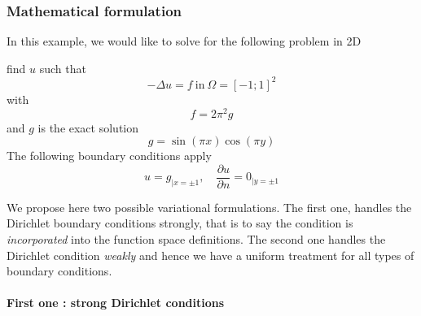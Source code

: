 \subsubsection{Mathematical formulation}
\label{sec:math-form-3}
In this example, we would like to solve for the following problem in 2D
\begin{problem}
\label{prob:1}
 find $u$ such that
\begin{equation}
  \label{eq:1}
  -\Delta u = f\ \text{in}\ \Omega = [-1;1]^2
\end{equation}
with
\begin{equation}
  \label{eq:2}
  f= 2 \pi^2  g
\end{equation}
and $g$ is the exact solution
\begin{equation}
  \label{eq:3}
  g=\sin(\pi x) \cos(\pi y)
\end{equation}
The following boundary conditions apply
\begin{equation}
  \label{eq:4}
  u=g_{|x=\pm 1}, \quad \frac{\partial u}{\partial n} = 0_{|y=\pm 1}
\end{equation}
\end{problem}

\noindent We propose here two possible variational formulations. The first one,
handles the Dirichlet boundary conditions strongly, that is to say the
condition is \emph{incorporated} into the function space definitions.
The second one handles the Dirichlet condition \emph{weakly} and hence
we have a uniform treatment for all types of boundary conditions.



\paragraph{First one : strong Dirichlet conditions}
\label{sec:strong-dirichl-cond}

